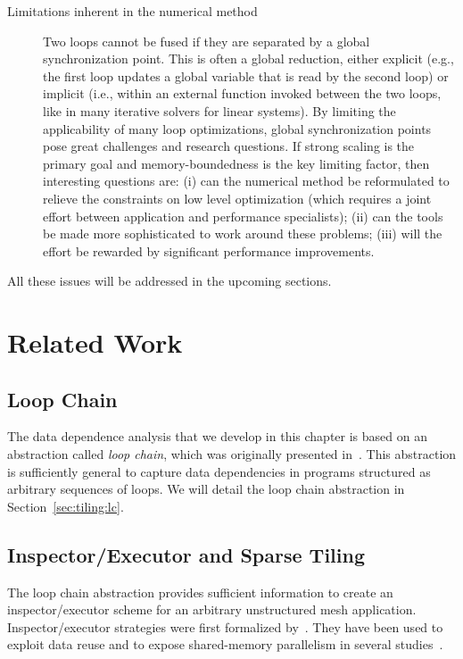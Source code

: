 \begin{description}
\item[Limitations inherent in the numerical method] Two loops cannot be fused if they are separated by a global synchronization point. This is often a global reduction, either explicit (e.g., the first loop updates a global variable that is read by the second loop) or implicit (i.e., within an external function invoked between the two loops, like in many iterative solvers for linear systems). By limiting the applicability of many loop optimizations, global synchronization points pose great challenges and research questions. If strong scaling is the primary goal and memory-boundedness is the key limiting factor, then interesting questions are: (i) can the numerical method be reformulated to relieve the constraints on low level optimization (which requires a joint effort between application and performance specialists); (ii) can the tools be made more sophisticated to work around these problems; (iii) will the effort be rewarded by significant performance improvements.
\end{description}

All these issues will be addressed in the upcoming sections.

\section{Related Work}
\label{sec:tiling:relatedwork}

\subsection*{Loop Chain}
The data dependence analysis that we develop in this chapter is based on an abstraction called \textit{loop chain}, which was originally presented in~\cite{ST-KriegerHIPS2013}. This abstraction is sufficiently general to capture data dependencies in programs structured as arbitrary sequences of loops. We will detail the loop chain abstraction in Section~\ref{sec:tiling:lc}.

\subsection*{Inspector/Executor and Sparse Tiling}
The loop chain abstraction provides sufficient information to create an inspector/executor scheme for an arbitrary unstructured mesh application. Inspector/executor strategies were first formalized by~\cite{ST-Saltz91}. They have been used to exploit data reuse and to expose shared-memory parallelism in several studies~\citep{ST-dimeEtna00,ST-StroutLCPC2002,ST-Demmel08,ST-KriegerIAAA2012}. 

